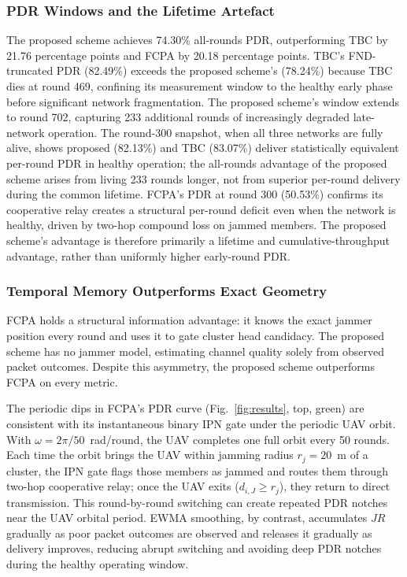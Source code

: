 \documentclass[conference]{IEEEtran}
\begin{document}
\subsubsection{PDR Windows and the Lifetime Artefact}
The proposed scheme achieves 74.30\% all-rounds PDR, outperforming TBC
by 21.76 percentage points and FCPA by 20.18 percentage points.
TBC's FND-truncated PDR (82.49\%) exceeds the proposed scheme's
(78.24\%) because TBC dies at round 469, confining its measurement
window to the healthy early phase before significant network
fragmentation. The proposed scheme's window extends to round 702,
capturing 233 additional rounds of increasingly degraded late-network
operation. The round-300 snapshot, when all three networks are fully
alive, shows proposed (82.13\%) and TBC (83.07\%) deliver statistically
equivalent per-round PDR in healthy operation; the all-rounds advantage
of the proposed scheme arises from living 233 rounds longer, not from
superior per-round delivery during the common lifetime. FCPA's PDR at
round 300 (50.53\%) confirms its cooperative relay creates a structural
per-round deficit even when the network is healthy, driven by two-hop
compound loss on jammed members. The proposed scheme's advantage is
therefore primarily a lifetime and cumulative-throughput advantage,
rather than uniformly higher early-round PDR.

\subsubsection{Temporal Memory Outperforms Exact Geometry}
FCPA holds a structural information advantage: it knows the exact jammer
position every round and uses it to gate cluster head candidacy.
The proposed scheme has no jammer model, estimating channel quality
solely from observed packet outcomes. Despite this asymmetry, the
proposed scheme outperforms FCPA on every metric.

The periodic dips in FCPA's PDR curve
(Fig.~\ref{fig:results}, top, green) are consistent with its
instantaneous binary IPN gate under the periodic UAV orbit. With
$\omega = 2\pi/50$~rad/round, the UAV completes one full orbit every
50 rounds. Each time the orbit brings the UAV within jamming radius
$r_j = 20$~m of a cluster, the IPN gate flags those members as jammed
and routes them through two-hop cooperative relay; once the UAV exits
($d_{i,J} \geq r_j$), they return to direct transmission. This
round-by-round switching can create repeated PDR notches near the UAV
orbital period. EWMA smoothing, by contrast, accumulates $JR$ gradually
as poor packet outcomes are observed and releases it gradually as
delivery improves, reducing abrupt switching and avoiding deep PDR
notches during the healthy operating window.
\end{document}

